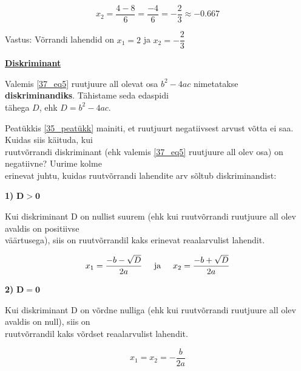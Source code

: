 \begin{center}
{{{\begin{flushleft}
\[ x_{2}=\dfrac{4-8}{6}=\dfrac{-4}{6}=-\dfrac{2}{3} \approx -0.667 \]

\vspace{2mm}
\hspace{5mm}
Vastus: Võrrandi lahendid on $x_{1}=2$ ja $x_{2}=-\dfrac{2}{3}$


\vspace{5mm}
\hspace{5mm}
\textbf{\underline{Diskriminant}}

\vspace{2mm}
\hspace{5mm}
Valemis \ref{37_eq5} ruutjuure all olevat osa $b^{2}-4ac$ nimetatakse \textbf{diskriminandiks}. Tähistame seda edaspidi\\ \hspace{5mm} tähega $D$, ehk $D=b^{2}-4ac$.

\vspace{2mm}
\hspace{5mm}
Peatükkis \ref{35_peatükk} mainiti, et ruutjuurt negatiivsest arvust võtta ei saa. Kuidas siis käituda, kui\\ \hspace{5mm} ruutvõrrandi diskriminant (ehk valemis \ref{37_eq5} ruutjuure all olev osa) on negatiivne? Uurime kolme\\ \hspace{5mm} erinevat juhtu, kuidas ruutvõrrandi lahendite arv sõltub diskriminandist:

\vspace{2mm}
\hspace{5mm}
\textbf{1)} $\mathbf{D>0}$

\vspace{2mm}
\hspace{5mm}
Kui diskriminant D on nullist suurem (ehk kui ruutvõrrandi ruutjuure all olev avaldis on positiivse\\ \hspace{5mm} väärtusega), siis on ruutvõrrandil kaks erinevat reaalarvulist lahendit.

\[ x_{1}=\dfrac{-b-\sqrt{D}}{2a} \hspace{5mm} \text{ja} \hspace{5mm} x_{2}=\dfrac{-b+\sqrt{D}}{2a} \]
  
\vspace{2mm}
\hspace{5mm}
\textbf{2)} $\mathbf{D=0}$

\vspace{2mm}
\hspace{5mm}
Kui diskriminant D on võrdne nulliga (ehk kui ruutvõrrandi ruutjuure all olev avaldis on null), siis on\\ \hspace{5mm} ruutvõrrandil kaks võrdset reaalarvulist lahendit.

\[x_{1}=x_{2}=-\dfrac{b}{2a} \]

\end{flushleft}
}}}
\end{center}




